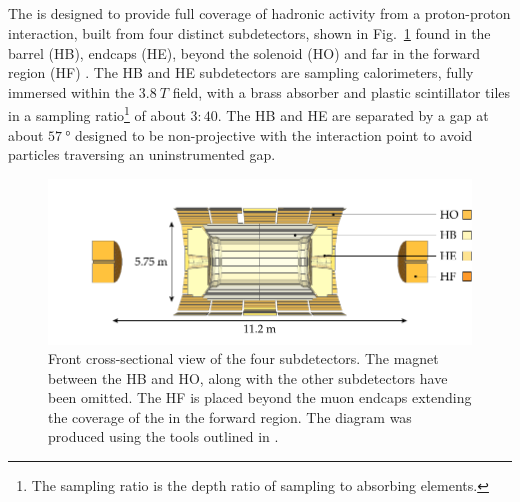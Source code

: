 \subsection{\HCAL}

The \HCAL is designed to provide full coverage of hadronic activity from a proton-proton interaction, built from four distinct subdetectors, shown in Fig.~\ref{fig:cms-hcal} found in the barrel (HB), endcaps (HE), beyond the solenoid (HO) and far in the forward region (HF) \cite{Mans:1481837}. The HB and HE subdetectors are sampling calorimeters, fully immersed within the ${\SI{3.8}{T}}$ field, with a brass absorber and plastic scintillator tiles in a sampling ratio\footnote{The sampling ratio is the depth ratio of sampling to absorbing elements.} of about $3:40$. The HB and HE are separated by a gap at about $\SI{57}{\degree}$ designed to be non-projective with the interaction point to avoid particles traversing an uninstrumented gap.

\begin{figure}[htb]
    \centering
    \includegraphics{diagrams/tikz/cms/annotated/cms_hcal.pdf}
    \caption[Front cross-section view of the four HCAL subdetectors]{
        Front cross-sectional view of the four \HCAL subdetectors. The magnet between the HB and HO, along with the other subdetectors have been omitted. The HF is placed beyond the muon endcaps extending the coverage of the \HCAL in the forward region. The diagram was produced using the tools outlined in \cite{Sakuma:2013jqa}.
    }
    \label{fig:cms-hcal}
\end{figure}

